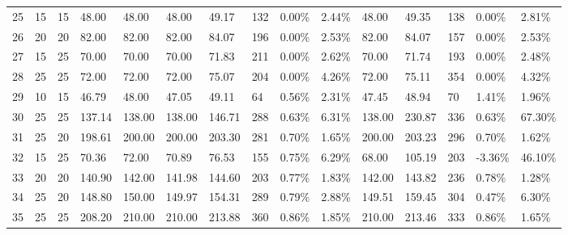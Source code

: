 \begin{longtable}{l|ll|ll|lllll|lllll}
  25 & 15                         & 15                         & 48.00                     & 48.00       & 48.00         & 49.17  & 132 & 0.00\%  & 2.44\% & 48.00  & 49.35  & 138 & 0.00\%  & 2.81\%  \\
  26 & 20                         & 20                         & 82.00                     & 82.00       & 82.00         & 84.07  & 196 & 0.00\%  & 2.53\% & 82.00  & 84.07  & 157 & 0.00\%  & 2.53\%  \\
  27 & 15                         & 25                         & 70.00                     & 70.00       & 70.00         & 71.83  & 211 & 0.00\%  & 2.62\% & 70.00  & 71.74  & 193 & 0.00\%  & 2.48\%  \\
  28 & 25                         & 25                         & 72.00                     & 72.00       & 72.00         & 75.07  & 204 & 0.00\%  & 4.26\% & 72.00  & 75.11  & 354 & 0.00\%  & 4.32\%  \\
  29 & 10                         & 15                         & 46.79                     & 48.00       & 47.05         & 49.11  & 64  & 0.56\%  & 2.31\% & 47.45  & 48.94  & 70  & 1.41\%  & 1.96\%  \\
  30 & 25                         & 25                         & 137.14                    & 138.00      & 138.00        & 146.71 & 288 & 0.63\%  & 6.31\% & 138.00 & 230.87 & 336 & 0.63\%  & 67.30\% \\
  31 & 25                         & 20                         & 198.61                    & 200.00      & 200.00        & 203.30 & 281 & 0.70\%  & 1.65\% & 200.00 & 203.23 & 296 & 0.70\%  & 1.62\%  \\
  32 & 15                         & 25                         & 70.36                     & 72.00       & 70.89         & 76.53  & 155 & 0.75\%  & 6.29\% & 68.00  & 105.19 & 203 & -3.36\% & 46.10\% \\
  33 & 20                         & 20                         & 140.90                    & 142.00      & 141.98        & 144.60 & 203 & 0.77\%  & 1.83\% & 142.00 & 143.82 & 236 & 0.78\%  & 1.28\%  \\
  34 & 25                         & 20                         & 148.80                    & 150.00      & 149.97        & 154.31 & 289 & 0.79\%  & 2.88\% & 149.51 & 159.45 & 304 & 0.47\%  & 6.30\%  \\
  35 & 25                         & 25                         & 208.20                    & 210.00      & 210.00        & 213.88 & 360 & 0.86\%  & 1.85\% & 210.00 & 213.46 & 333 & 0.86\%  & 1.65\%  \\

\end{longtable}
